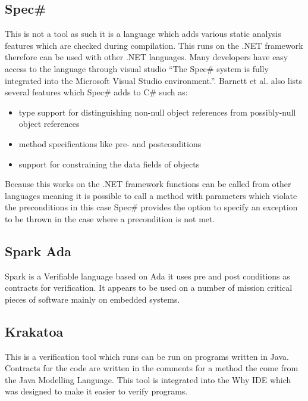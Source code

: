 \documentclass[a4paper,12pt]{scrartcl}
\begin{document}
{		\subsection{\texorpdfstring{Spec\#}{}}
		{
			This is not a tool as such it is a language which adds various static analysis features which are checked during compilation. This runs on the .NET framework therefore can be used with other .NET languages. Many developers have easy access to the language through visual studio \enquote{The Spec\# system is fully integrated into the Microsoft Visual Studio environment.}\cite{Barnett2005}. Barnett et al. also lists several features which Spec\# adds to C\# such as:
			\begin{itemize}
				\item{type support for distinguishing non-null object references from possibly-null object references}
				\item{method specifications like pre- and postconditions}
				\item{support for constraining the data fields of objects}
			\end{itemize}
			Because this works on the .NET framework functions can be called from other languages meaning it is possible to call a method with parameters which violate the preconditions in this case Spec\# provides the option to specify an exception to be thrown in the case where a precondition is not met.
		}
		\subsection{Spark Ada}
		{
			Spark is a Verifiable language based on Ada it uses pre and post conditions as contracts for verification. It appears to be used on a number of mission critical pieces of software mainly on embedded systems. 
		}
		\subsection{Krakatoa \cite{Marche2018,Filliatre2007}}\label{sec:krakatoa}
		{
			This is a verification tool which runs can be run on programs written in Java. Contracts for the code are written in the comments for a method the come from the Java Modelling Language\cite{Burdy2004}. This tool is integrated into the Why IDE which was designed to make it easier to verify programs.
		}
		
	}
\end{document}
